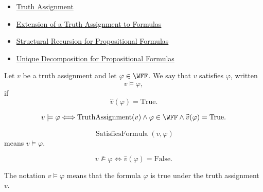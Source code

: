 \begin{dependencies}
\begin{itemize}
  \item \hyperref[def:truth-assignment-propositional-logic]{Truth Assignment}
  \item \hyperref[def:extended-truth-assignment-propositional-logic]{Extension of a Truth Assignment to Formulas}
  \item \hyperref[thm:structural-recursion-propositional-formulas]{Structural Recursion for Propositional Formulas}
  \item \hyperref[thm:unique-decomposition-propositional-formulas]{Unique Decomposition for Propositional Formulas}
\end{itemize}
\end{dependencies}
\begin{tcolorbox}[colback=propbox, colframe=propborder, arc=2pt,
  left=6pt, right=6pt, top=4pt, bottom=4pt,
  title={\small\textbf{Definition (Satisfaction of a Formula)}},
  fonttitle=\small\bfseries]
\begin{definition}
\label{def:satisfaction-propositional-formula}
Let \(v\) be a truth assignment and let \(\varphi\in\WFF\). We say that \(v\) satisfies \(\varphi\), written
\[
v\models\varphi,
\]
if
\[
\widehat v(\varphi)=\mathrm{True}.
\]
\end{definition}
\end{tcolorbox}

\begin{remark*}
\[
v\models\varphi
\Longleftrightarrow
\operatorname{TruthAssignment}(v)
\land
\varphi\in\WFF
\land
\widehat v(\varphi)=\mathrm{True}.
\]
\end{remark*}

\begin{remark*}
\[
\operatorname{SatisfiesFormula}(v,\varphi)
\]
means \(v\models\varphi\).
\end{remark*}

\begin{remark*}
\[
v\not\models\varphi
\Longleftrightarrow
\widehat v(\varphi)=\mathrm{False}.
\]
\end{remark*}

\begin{remark*}[Interpretation]
The notation \(v\models\varphi\) means that the formula \(\varphi\) is true under the truth assignment \(v\).
\end{remark*}

